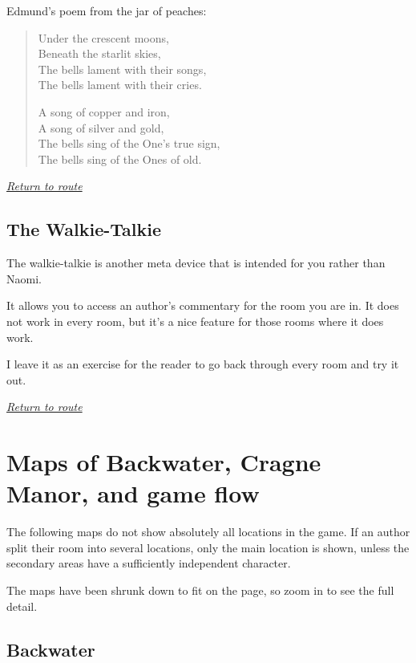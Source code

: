 \documentclass[a5paper]{extarticle}
\begin{document}
Edmund's poem from the jar of peaches:

\begin{quote}
Under the crescent moons,\\
Beneath the starlit skies,\\
The bells lament with their songs,\\
The bells lament with their cries.

A song of copper and iron,\\
A song of silver and gold,\\
The bells sing of the One's true sign,\\
The bells sing of the Ones of old.
\end{quote}

\hyperref[sec:route-8]{\emph{Return to route}}

\newpage
\subsection{The Walkie-Talkie}\label{sec:nb-walkie-talkie}

The walkie-talkie is another meta device that is intended for you rather than
Naomi.

It allows you to access an author's commentary for the room you are in.
It does not work in every room,
but it's a nice feature for those rooms where it does work.

I leave it as an exercise for the reader to go back through every room and try
it out.

\hyperref[sec:route-10]{\emph{Return to route}}

\newpage
\section{Maps of Backwater, Cragne Manor, and game flow}\label{sec:full-map}

The following maps do not show absolutely all locations in the game.
If an author split their room into several locations, only the main location
is shown, unless the secondary areas have a sufficiently independent character.

The maps have been shrunk down to fit on the page,
so zoom in to see the full detail.

\subsection{Backwater}
\end{document}
